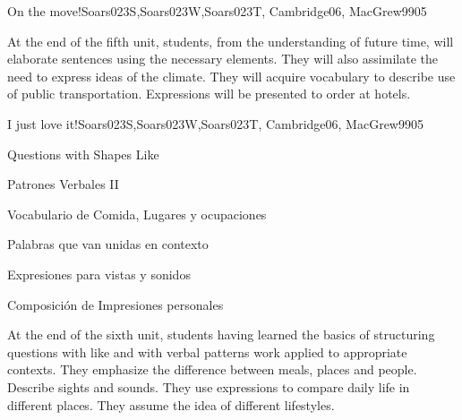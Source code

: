 \begin{syllabus}
\begin{unit}{On the move!}{Soars023S,Soars023W,Soars023T, Cambridge06, MacGrew99}{0}{5}
   \begin{learningoutcomes}
      \item At the end of the fifth unit, students, from the understanding of future time, will elaborate sentences using the necessary elements. They will also assimilate the need to express ideas of the climate. They will acquire vocabulary to describe use of public transportation. Expressions will be presented to order at hotels.
   \end{learningoutcomes}

\end{unit}

\begin{unit}{I just love it!}{Soars023S,Soars023W,Soars023T, Cambridge06, MacGrew99}{0}{5}
   \begin{topics}
      \item Questions with Shapes Like
      \item Patrones Verbales II
      \item Vocabulario de Comida, Lugares y ocupaciones
      \item Palabras que van unidas en contexto
      \item Expresiones para vistas y sonidos
      \item Composición de Impresiones personales
   \end{topics}

   \begin{learningoutcomes}
      \item At the end of the sixth unit, students having learned the basics of structuring questions with like and with verbal patterns work applied to appropriate contexts. They emphasize the difference between meals, places and people. Describe sights and sounds. They use expressions to compare daily life in different places. They assume the idea of different lifestyles.
   \end{learningoutcomes}
\end{unit}

\begin{coursebibliography}
\end{coursebibliography}

\end{syllabus}
